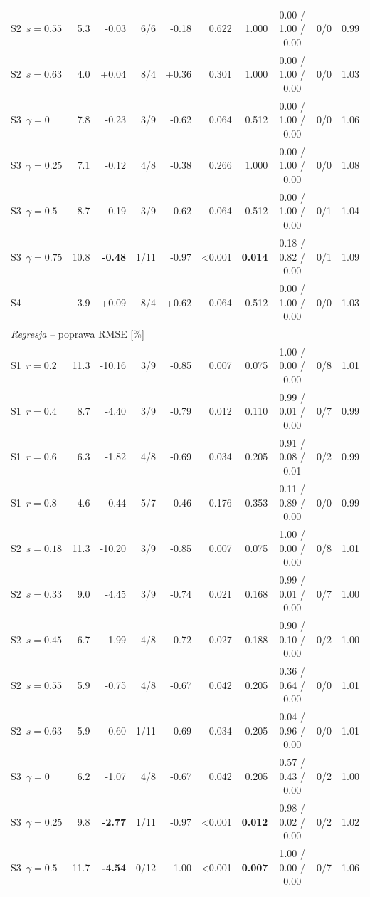 {\begin{longtable}{lrrrrrrcrr}
S2~$s=0.55$ & 5.3 & -0.03 & 6/6 & -0.18 & 0.622 & 1.000 & 0.00 / 1.00 / 0.00 & 0/0 & 0.99 \\
S2~$s=0.63$ & 4.0 & +0.04 & 8/4 & +0.36 & 0.301 & 1.000 & 0.00 / 1.00 / 0.00 & 0/0 & 1.03 \\
S3~$\gamma=0$ & 7.8 & -0.23 & 3/9 & -0.62 & 0.064 & 0.512 & 0.00 / 1.00 / 0.00 & 0/0 & 1.06 \\
S3~$\gamma=0.25$ & 7.1 & -0.12 & 4/8 & -0.38 & 0.266 & 1.000 & 0.00 / 1.00 / 0.00 & 0/0 & 1.08 \\
S3~$\gamma=0.5$ & 8.7 & -0.19 & 3/9 & -0.62 & 0.064 & 0.512 & 0.00 / 1.00 / 0.00 & 0/1 & 1.04 \\
S3~$\gamma=0.75$ & 10.8 & \textbf{-0.48} & 1/11 & -0.97 & <0.001 & \textbf{0.014} & 0.18 / 0.82 / 0.00 & 0/1 & 1.09 \\
S4 & 3.9 & +0.09 & 8/4 & +0.62 & 0.064 & 0.512 & 0.00 / 1.00 / 0.00 & 0/0 & 1.03 \\
\midrule
\multicolumn{10}{l}{\emph{Regresja} -- poprawa RMSE [\%]}\\
S1~$r=0.2$ & 11.3 & -10.16 & 3/9 & -0.85 & 0.007 & 0.075 & 1.00 / 0.00 / 0.00 & 0/8 & 1.01 \\
S1~$r=0.4$ & 8.7 & -4.40 & 3/9 & -0.79 & 0.012 & 0.110 & 0.99 / 0.01 / 0.00 & 0/7 & 0.99 \\
S1~$r=0.6$ & 6.3 & -1.82 & 4/8 & -0.69 & 0.034 & 0.205 & 0.91 / 0.08 / 0.01 & 0/2 & 0.99 \\
S1~$r=0.8$ & 4.6 & -0.44 & 5/7 & -0.46 & 0.176 & 0.353 & 0.11 / 0.89 / 0.00 & 0/0 & 0.99 \\
S2~$s=0.18$ & 11.3 & -10.20 & 3/9 & -0.85 & 0.007 & 0.075 & 1.00 / 0.00 / 0.00 & 0/8 & 1.01 \\
S2~$s=0.33$ & 9.0 & -4.45 & 3/9 & -0.74 & 0.021 & 0.168 & 0.99 / 0.01 / 0.00 & 0/7 & 1.00 \\
S2~$s=0.45$ & 6.7 & -1.99 & 4/8 & -0.72 & 0.027 & 0.188 & 0.90 / 0.10 / 0.00 & 0/2 & 1.00 \\
S2~$s=0.55$ & 5.9 & -0.75 & 4/8 & -0.67 & 0.042 & 0.205 & 0.36 / 0.64 / 0.00 & 0/0 & 1.01 \\
S2~$s=0.63$ & 5.9 & -0.60 & 1/11 & -0.69 & 0.034 & 0.205 & 0.04 / 0.96 / 0.00 & 0/0 & 1.01 \\
S3~$\gamma=0$ & 6.2 & -1.07 & 4/8 & -0.67 & 0.042 & 0.205 & 0.57 / 0.43 / 0.00 & 0/2 & 1.00 \\
S3~$\gamma=0.25$ & 9.8 & \textbf{-2.77} & 1/11 & -0.97 & <0.001 & \textbf{0.012} & 0.98 / 0.02 / 0.00 & 0/2 & 1.02 \\
S3~$\gamma=0.5$ & 11.7 & \textbf{-4.54} & 0/12 & -1.00 & <0.001 & \textbf{0.007} & 1.00 / 0.00 / 0.00 & 0/7 & 1.06 \\

\end{longtable}}
